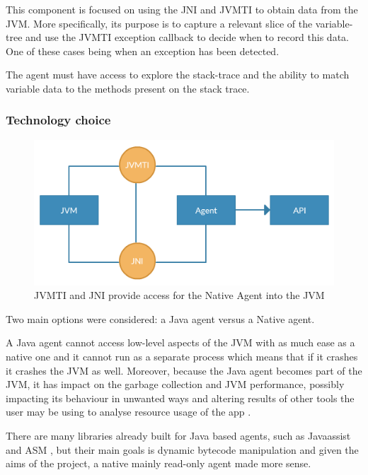 This component is focused on using the JNI and JVMTI to obtain data from the JVM. More specifically, its purpose is to capture a relevant slice of the variable-tree and use the JVMTI exception callback to decide when to record this data. One of these cases being when an exception has been detected.

The agent must have access to explore the stack-trace and the ability to match variable data to the methods present on the stack trace.

\subsubsection{Technology choice}

\begin{figure}[H]
  \centering
    \includegraphics[width=\textwidth]{jvmti.png} 
  \caption[JVMTI and JNI provide access for the Native Agent to the JVM]{JVMTI and JNI provide access for the Native Agent into the JVM}

\end{figure} 

Two main options were considered: a Java agent versus a Native agent.

A Java agent cannot access low-level aspects of the JVM with as much ease as a native one and it cannot run as a separate process which means that if it crashes it crashes the JVM as well. Moreover, because the Java agent becomes part of the JVM, it has impact on the garbage collection and JVM performance, possibly impacting its behaviour in unwanted ways and altering results of other tools the user may be using to analyse resource usage of the app \cite{javavsnativetaki,javavsnativetdyna}.

There are many libraries already built for Java based agents, such as Javaassist \cite{javassist} and ASM \cite{asm}, but their main goals is dynamic bytecode manipulation and given the aims of the project, a native mainly read-only agent made more sense.

